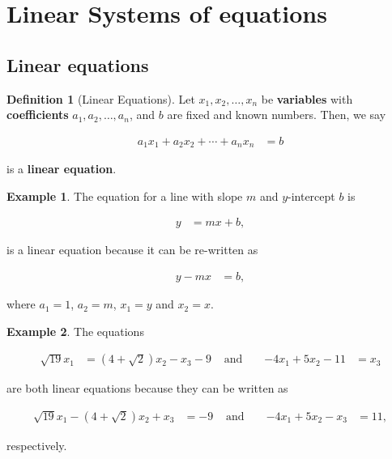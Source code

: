 \documentclass[
]{book}
\theoremstyle{definition}
\newtheorem{definition}{Definition}[chapter]
\theoremstyle{definition}
\newtheorem{example}{Example}[chapter]
\theoremstyle{definition}
\theoremstyle{remark}
\begin{document}
\hypertarget{linear-systems-of-equations-1}{%
\section{Linear Systems of equations}\label{linear-systems-of-equations-1}}

\hypertarget{linear-equations}{%
\subsection{Linear equations}\label{linear-equations}}

\begin{definition}[Linear Equations]
\protect\hypertarget{def:unnamed-chunk-19}{}{\label{def:unnamed-chunk-19} {} }Let \(x_1, x_2, \ldots, x_n\) be \textbf{variables} with \textbf{coefficients} \(a_1, a_2, \ldots, a_n\), and \(b\) are fixed and known numbers. Then, we say

\[
\begin{aligned}
a_1 x_1 + a_2 x_2 + \cdots + a_n x_n & = b
\end{aligned}
\label{eq:linear}
\]

is a \textbf{linear equation}.
\end{definition}

\begin{example}
\protect\hypertarget{exm:unnamed-chunk-20}{}{\label{exm:unnamed-chunk-20} }The equation for a line with slope \(m\) and \(y\)-intercept \(b\) is

\[
\begin{aligned}
y & = m x + b,
\end{aligned}
\]

is a linear equation because it can be re-written as

\[
\begin{aligned}
y - m x & = b,
\end{aligned}
\]

where \(a_1 = 1\), \(a_2 = m\), \(x_1 = y\) and \(x_2 = x\).
\end{example}

\begin{example}
\protect\hypertarget{exm:unnamed-chunk-21}{}{\label{exm:unnamed-chunk-21} }The equations

\[
\begin{aligned}
\sqrt{19} x_1 & = (4 + \sqrt{2}) x_2 - x_3 - 9
& \mbox{ and } && 
-4 x_1 + 5 x_2 - 11 & = x_3
\end{aligned}
\]

are both linear equations because they can be written as

\[
\begin{aligned}
\sqrt{19} x_1 - (4 + \sqrt{2}) x_2 + x_3 & = - 9 
& \mbox{ and } &&
-4 x_1 + 5 x_2 - x_3 & = 11,
\end{aligned}
\]

respectively.
\end{example}
\end{document}
